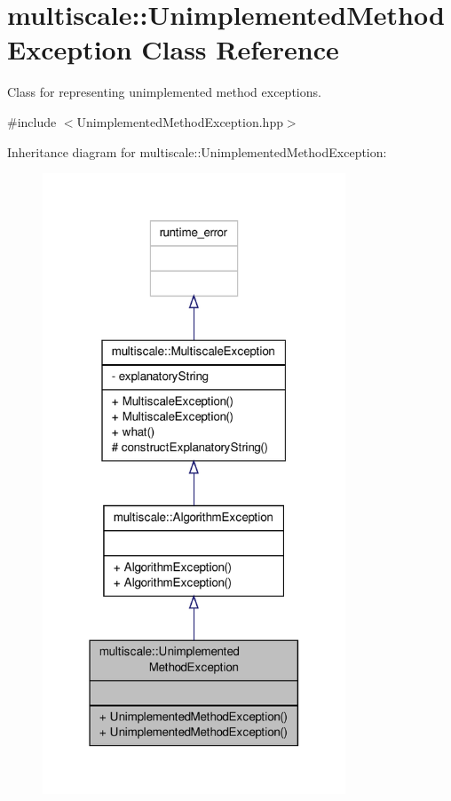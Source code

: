 \hypertarget{classmultiscale_1_1UnimplementedMethodException}{\section{multiscale\-:\-:Unimplemented\-Method\-Exception Class Reference}
\label{classmultiscale_1_1UnimplementedMethodException}
}


Class for representing unimplemented method exceptions.  




{\ttfamily \#include $<$Unimplemented\-Method\-Exception.\-hpp$>$}



Inheritance diagram for multiscale\-:\-:Unimplemented\-Method\-Exception\-:\nopagebreak
\begin{figure}[H]
\begin{center}
\leavevmode
\includegraphics[width=256pt]{classmultiscale_1_1UnimplementedMethodException__inherit__graph}
\end{center}
\end{figure}


